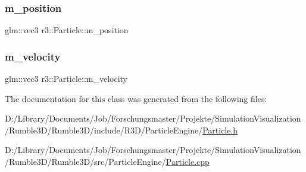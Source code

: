\mbox{\label{classr3_1_1_particle_ab7f5aa7cf48278441aab18db1a0c1ba9}} 
\subsubsection{\texorpdfstring{m\+\_\+position}{m\_position}}
{\footnotesize\ttfamily glm\+::vec3 r3\+::\+Particle\+::m\+\_\+position\hspace{0.3cm}{\ttfamily [protected]}}

\mbox{\label{classr3_1_1_particle_a037d73e42df0c7bb9f1ae79b37301477}} 
\subsubsection{\texorpdfstring{m\+\_\+velocity}{m\_velocity}}
{\footnotesize\ttfamily glm\+::vec3 r3\+::\+Particle\+::m\+\_\+velocity\hspace{0.3cm}{\ttfamily [protected]}}



The documentation for this class was generated from the following files\+:\begin{DoxyCompactItemize}
\item 
D\+:/\+Library/\+Documents/\+Job/\+Forschungsmaster/\+Projekte/\+Simulation\+Visualization/\+Rumble3\+D/\+Rumble3\+D/include/\+R3\+D/\+Particle\+Engine/\mbox{\hyperlink{_particle_8h}{Particle.\+h}}\item 
D\+:/\+Library/\+Documents/\+Job/\+Forschungsmaster/\+Projekte/\+Simulation\+Visualization/\+Rumble3\+D/\+Rumble3\+D/src/\+Particle\+Engine/\mbox{\hyperlink{_particle_8cpp}{Particle.\+cpp}}\end{DoxyCompactItemize}
